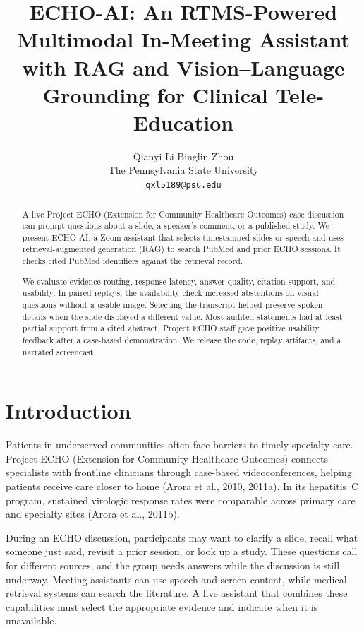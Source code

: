 \documentclass[11pt]{article}
\title{ECHO-AI: An RTMS-Powered Multimodal In-Meeting Assistant with RAG and Vision--Language Grounding for Clinical Tele-Education}
\author{Qianyi Li \quad Binglin Zhou \\ The Pennsylvania State University \\ \texttt{qxl5189@psu.edu}}
\begin{document}
\maketitle

\begin{abstract}

A live Project ECHO (Extension for Community Healthcare Outcomes) case discussion can prompt questions about a slide, a speaker's comment, or a published study. We present ECHO-AI, a Zoom assistant that selects timestamped slides or speech and uses retrieval-augmented generation (RAG) to search PubMed and prior ECHO sessions. It checks cited PubMed identifiers against the retrieval record.

We evaluate evidence routing, response latency, answer quality, citation support, and usability. In paired replays, the availability check increased abstentions on visual questions without a usable image. Selecting the transcript helped preserve spoken details when the slide displayed a different value. Most audited statements had at least partial support from a cited abstract. Project ECHO staff gave positive usability feedback after a case-based demonstration. We release the code, replay artifacts, and a narrated screencast.

\end{abstract}

\section{Introduction}

Patients in underserved communities often face barriers to timely specialty care. Project ECHO (Extension for Community Healthcare Outcomes) connects specialists with frontline clinicians through case-based videoconferences, helping patients receive care closer to home (Arora et al., 2010, 2011a). In its hepatitis~C program, sustained virologic response rates were comparable across primary care and specialty sites (Arora et al., 2011b).

During an ECHO discussion, participants may want to clarify a slide, recall what someone just said, revisit a prior session, or look up a study. These questions call for different sources, and the group needs answers while the discussion is still underway. Meeting assistants can use speech and screen content, while medical retrieval systems can search the literature. A live assistant that combines these capabilities must select the appropriate evidence and indicate when it is unavailable.
\end{document}

